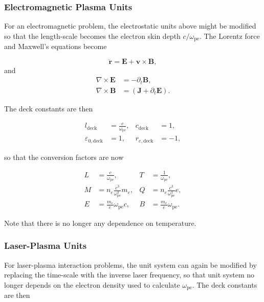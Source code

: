 \documentclass[twocolumn,10pt]{article}
\renewcommand{\vec}[1]{\mathbf{#1}}
\newcommand{\omegap}{\omega_{\mathrm{pe}}}
\begin{document}
	\subsubsection{Electromagnetic Plasma Units}

	For an electromagnetic problem, the electrostatic units above might be modified so that the length-scale becomes the electron skin depth $c/\omegap$. The Lorentz force and Maxwell's equations become

	\begin{equation*}
		\ddot{\vec{r}} = \vec{E} + \vec{v} \times \vec{B},
	\end{equation*}
	\noindent and
	\begin{align*}
		\nabla \times \vec{E} &= -\partial_t \vec{B}, \\
		\nabla \times \vec{B} &= \left(\vec{J} + \partial_t \vec{E}\right).
	\end{align*}

	\noindent The deck constants are then

	\begin{align*}
		l_{\mathrm{deck}} &= \frac{c}{\omegap}, &
		c_{\mathrm{deck}} &= 1, \\
		\varepsilon_{0,\mathrm{deck}} &= 1, &
		r_{e,\mathrm{deck}} &= -1,
	\end{align*}

	\noindent so that the conversion factors are now

	\begin{align*}
		L &= \frac{c}{\omega_{\mathrm{pe}}}, &
		T &= \frac{1}{\omega_{\mathrm{pe}}}, \\
		M &= n_e\frac{c^3}{\omegap^3}m_e, &
		Q &= n_e\frac{c^3}{\omegap^3}e, \\
		E &= \frac{m_e}{e}\omegap c, &
		B &= \frac{m_e}{e}\omegap.
	\end{align*}

	\noindent Note that there is no longer any dependence on temperature.

	\subsubsection{Laser-Plasma Units}

	For laser-plasma interaction problems, the unit system can again be modified by replacing the time-scale with the inverse laser frequency, so that unit system no longer depends on the electron density used to calculate $\omega_{\mathrm{pe}}$. The deck constants are then
\end{document}
